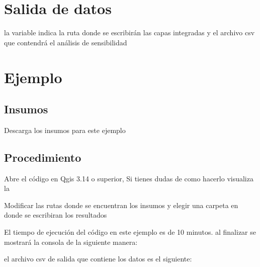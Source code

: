 \documentclass[letterpaper,10pt,spanish]{sphinxmanual}
\begin{document}
\section{Salida de datos}
\label{\detokenize{analisis:salida-de-datos}}
la variable  indica la ruta donde se escribirán las
capas integradas y el archivo csv que contendrá el análisis de sensibilidad


\section{Ejemplo}
\label{\detokenize{analisis:ejemplo}}

\subsection{Insumos}
\label{\detokenize{analisis:insumos}}
Descarga los insumos para este ejemplo  


\subsection{Procedimiento}
\label{\detokenize{analisis:procedimiento}}
Abre el código  en Qgis 3.14 o superior,
Si tienes dudas de como hacerlo visualiza la 

Modificar las rutas donde se encuentran los insumos y
elegir una carpeta en donde se escribiran los resultados

\noindent{}

El tiempo de ejecución del código en este ejemplo es de 10 minutos.
al finalizar se mostrará la consola de la siguiente manera:

\noindent{}

el archivo csv de salida que contiene los datos es el siguiente:
\end{document}
